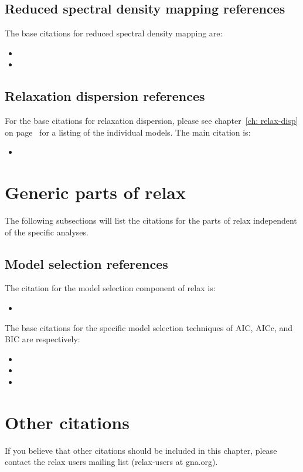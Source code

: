 
\subsection*{Reduced spectral density mapping references}

The base citations for reduced spectral density mapping are:
\begin{itemize}
  \item {}
  \item {}
\end{itemize}



\subsection*{Relaxation dispersion references}

For the base citations for relaxation dispersion, please see chapter~\ref{ch: relax-disp} on page~\pageref{ch: relax-disp} for a listing of the individual models.
The main citation is:
\begin{itemize}
  \item {}
\end{itemize}




\section*{Generic parts of relax}

The following subsections will list the citations for the parts of relax independent of the specific analyses.



\subsection*{Model selection references}

The citation for the model selection component of relax is:
\begin{itemize}
  \item {}
\end{itemize}

The base citations for the specific model selection techniques of AIC, AICc, and BIC are respectively:
\begin{itemize}
  \item {}
  \item {}
  \item {}
\end{itemize}




\section*{Other citations}

If you believe that other citations should be included in this chapter, please contact the relax users mailing list (relax-users at gna.org).
